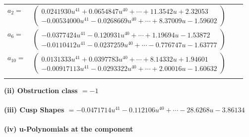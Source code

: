 \documentclass[1p]{elsarticle_modified}
\theoremstyle{definition}
\begin{document}
\begin{tabular}{m{7pt} m{180pt} m{7pt} m{180pt} }
\flushright $a_{2}=$&$\begin{pmatrix}0.0241930 u^{41}+0.0654847 u^{40}+\cdots+11.3542 u+2.32053\\-0.00534000 u^{41}-0.0268669 u^{40}+\cdots+8.37009 u-1.59602\end{pmatrix}$ \\
\flushright $a_{6}=$&$\begin{pmatrix}-0.0377424 u^{41}-0.120931 u^{40}+\cdots+1.19694 u-1.53872\\-0.0110412 u^{41}-0.0237259 u^{40}+\cdots-0.776747 u-1.63777\end{pmatrix}$ \\
\flushright $a_{10}=$&$\begin{pmatrix}0.0131333 u^{41}+0.0397783 u^{40}+\cdots+8.14332 u+1.94601\\-0.00917113 u^{41}-0.0293322 u^{40}+\cdots+2.00016 u-1.60632\end{pmatrix}$\\&\end{tabular}
\flushleft \textbf{(ii) Obstruction class $= -1$}\\~\\
\flushleft \textbf{(iii) Cusp Shapes $= -0.0471714 u^{41}-0.112106 u^{40}+\cdots-28.6268 u-3.86134$}\\~\\
\newpage\renewcommand{\arraystretch}{1}
\flushleft \textbf{(iv) u-Polynomials at the component}\newline \\
\end{document}
